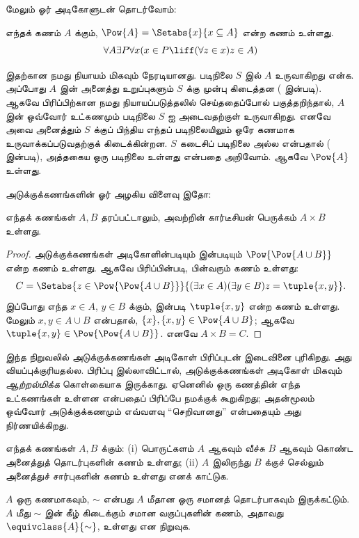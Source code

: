 \documentclass[../../../include/open-logic-section]{subfiles}
\begin{document}

மேலும் ஓர் அடிகோளுடன் தொடர்வோம்:

\begin{axiom}[அடுக்குக்கணங்கள்]
எந்தக் கணம் $A$ க்கும், $\Pow{A} = \Setabs{x}{x \subseteq A}$ என்ற
கணம் உள்ளது.
\[
	\forall A \exists P \forall x(x \in P \liff (\forall z \in x)z \in A)
\]
\end{axiom}

இதற்கான நமது நியாயம் மிகவும் நேரடியானது. படிநிலை $S$ இல் $A$
உருவாகிறது என்க. அப்போது $A$ இன் அனைத்து உறுப்புகளும் $S$ க்கு முன்பு
கிடைத்தன (\stagesacc{} இன்படி). ஆகவே பிரிப்பிற்கான நமது
நியாயப்படுத்தலில் செய்ததைப்போல் பகுத்தறிந்தால், $A$ இன் ஒவ்வோர் உட்கணமும்
படிநிலை $S$ ஐ அடைவதற்குள் உருவாகிறது. எனவே அவை அனைத்தும் $S$ க்குப்
பிந்திய எந்தப் படிநிலையிலும் ஒரே கணமாக உருவாக்கப்படுவதற்குக் கிடைக்கின்றன.
$S$ கடைசிப் படிநிலை அல்ல என்பதால் (\stagessucc{} இன்படி), அத்தகைய ஒரு
படிநிலை உள்ளது என்பதை அறிவோம். ஆகவே $\Pow{A}$ உள்ளது.

அடுக்குக்கணங்களின் ஓர் அழகிய விளைவு இதோ:

\begin{prop}\label{thm:Products}
எந்தக் கணங்கள் $A, B$ தரப்பட்டாலும், அவற்றின் கார்டீசியன் பெருக்கம்
$A \times B$ உள்ளது.
\end{prop}

\begin{proof}
அடுக்குக்கணங்கள் அடிகோளின்படியும்
 இன்படியும்
$\Pow{\Pow{A \cup B}}$ என்ற கணம் உள்ளது. ஆகவே பிரிப்பின்படி, பின்வரும்
கணம் உள்ளது:
\[
	C = \Setabs{z \in \Pow{\Pow{A \cup B}}}{(\exists x \in A)(\exists y \in B) z = \tuple{x, y}}.
\]
இப்போது எந்த $x \in A$, $y \in B$ க்கும்,
 இன்படி $\tuple{x, y}$ என்ற
கணம் உள்ளது. மேலும் $x, y \in A \cup B$ என்பதால்,
$\{x\}, \{x, y\} \in \Pow{A \cup B}$; ஆகவே
$\tuple{x,y} \in \Pow{\Pow{A \cup B}}$. எனவே $A \times B = C$.
\end{proof}

இந்த நிறுவலில் அடுக்குக்கணங்கள் அடிகோள் பிரிப்புடன் இடைவினை புரிகிறது.
அது வியப்புக்குரியதல்ல. பிரிப்பு இல்லாவிட்டால், அடுக்குக்கணங்கள் அடிகோள்
மிகவும் \emph{ஆற்றல்மிக்க} கொள்கையாக இருக்காது. ஏனெனில் ஒரு கணத்தின்
எந்த உட்கணங்கள் உள்ளன என்பதைப் பிரிப்பே நமக்குக் கூறுகிறது; அதன்மூலம்
ஒவ்வோர் அடுக்குக்கணமும் எவ்வளவு ``செறிவானது'' என்பதையும் அது
நிர்ணயிக்கிறது.

\begin{prob}
எந்தக் கணங்கள் $A, B$ க்கும்: (i) பொருட்களம் $A$ ஆகவும் வீச்சு $B$
ஆகவும் கொண்ட அனைத்துத் தொடர்புகளின் கணம் உள்ளது; (ii) $A$ இலிருந்து
$B$ க்குச் செல்லும் அனைத்துச் சார்புகளின் கணம் உள்ளது எனக் காட்டுக.
\end{prob}

\begin{prob}
$A$ ஒரு கணமாகவும், $\sim$ என்பது $A$ மீதான ஒரு சமானத் தொடர்பாகவும்
இருக்கட்டும். $A$ மீது $\sim$ இன் கீழ் கிடைக்கும் சமான வகுப்புகளின்
கணம், அதாவது $\equivclass{A}{\sim}$, உள்ளது என நிறுவுக.
\end{prob}
\end{document}
